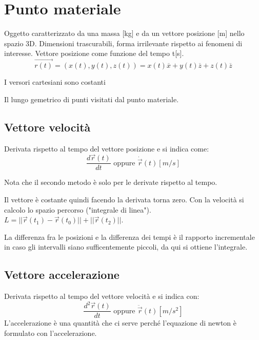 \section{Punto materiale}
Oggetto caratterizzato da una massa [kg] e da un vettore posizione [m] nello spazio 3D.
Dimensioni trascurabili, forma irrilevante rispetto ai fenomeni di interesse.
Vettore posizione come funzione del tempo t[s].
$$\vec{r(t)} = (x(t), y(t), z(t)) = x(t)\overline{x} + y(t)\overline{z} + z(t)\overline{z}$$
\begin{observation}
    I versori cartesiani sono costanti
\end{observation}


\begin{definition}[Traiettoria]
    Il lungo gemetrico di punti visitati dal punto materiale.
\end{definition}

\subsection*{Vettore velocità}
Derivata rispetto al tempo del vettore posizione e si indica come:
$$\frac{d\vec{r}(t)}{dt}\text{ oppure }\dot{\vec{r}}(t)[m/s]$$
\begin{note}
    Nota che il secondo metodo è solo per le derivate rispetto al tempo.
\end{note}

Il vettore è costante quindi facendo la derivata torna zero. 
Con la velocità si calcolo lo spazio percorso ("integrale di linea").
$L = ||\vec{r}(t_1) - \vec{r}(t_0)|| + ||\vec{r}(t_2)||$.

La differenza fra le posizioni e la differenza dei tempi è il rapporto incrementale in caso gli intervalli siano sufficentemente
piccoli, da qui si ottiene l'integrale.

\subsection{Vettore accelerazione}
Derivata rispetto al tempo del vettore velocità e si indica con:
$$\frac{d^2\vec{r}(t)}{dt} \text{ oppure } \ddot{\vec{r}}(t) [m/s^2]$$
L'accelerazione è una quantità che ci serve perché l'equazione di newton è formulato con l'accelerazione.

